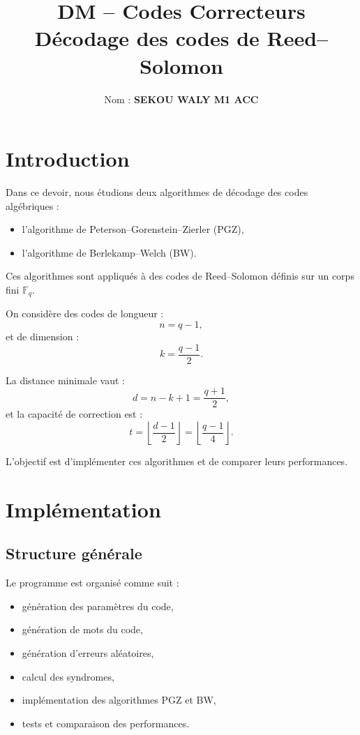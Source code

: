 \documentclass[a4paper,11pt]{article}
\title{\textbf{DM -- Codes Correcteurs}\\
Décodage des codes de Reed--Solomon}
\author{Nom : \textbf{SEKOU WALY M1 ACC}}
\date{}
\begin{document}
\maketitle

\section{Introduction}

Dans ce devoir, nous étudions deux algorithmes de décodage des codes algébriques :
\begin{itemize}
    \item l'algorithme de Peterson--Gorenstein--Zierler (PGZ),
    \item l'algorithme de Berlekamp--Welch (BW).
\end{itemize}

Ces algorithmes sont appliqués à des codes de Reed--Solomon définis sur un corps fini $\mathbb{F}_q$.

On considère des codes de longueur :
\[
n = q - 1,
\]
et de dimension :
\[
k = \frac{q - 1}{2}.
\]

La distance minimale vaut :
\[
d = n - k + 1 = \frac{q + 1}{2},
\]
et la capacité de correction est :
\[
t = \left\lfloor \frac{d - 1}{2} \right\rfloor = \left\lfloor \frac{q - 1}{4} \right\rfloor.
\]

L’objectif est d’implémenter ces algorithmes et de comparer leurs performances.

\section{Implémentation}

\subsection{Structure générale}

Le programme est organisé comme suit :
\begin{itemize}
    \item génération des paramètres du code,
    \item génération de mots du code,
    \item génération d'erreurs aléatoires,
    \item calcul des syndromes,
    \item implémentation des algorithmes PGZ et BW,
    \item tests et comparaison des performances.
\end{itemize}
\end{document}
